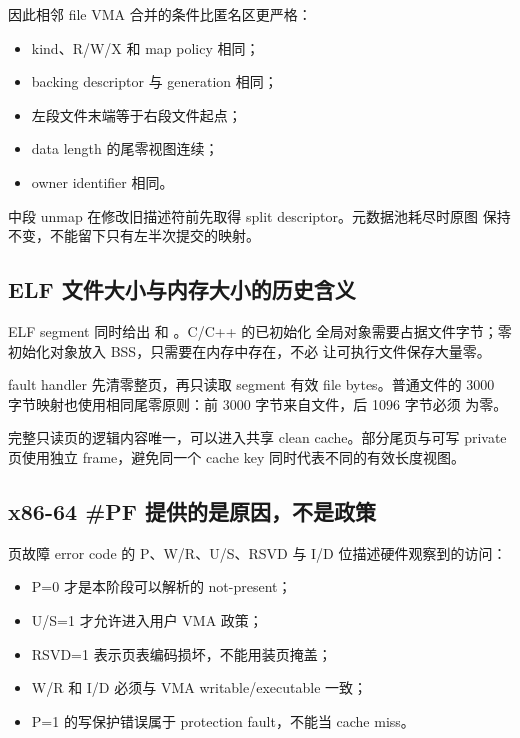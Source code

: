 因此相邻 file VMA 合并的条件比匿名区更严格：

\begin{itemize}
  \item kind、R/W/X 和 map policy 相同；
  \item backing descriptor 与 generation 相同；
  \item 左段文件末端等于右段文件起点；
  \item data length 的尾零视图连续；
  \item owner identifier 相同。
\end{itemize}

中段 unmap 在修改旧描述符前先取得 split descriptor。元数据池耗尽时原图
保持不变，不能留下只有左半次提交的映射。

\subsection{ELF 文件大小与内存大小的历史含义}

ELF segment 同时给出  和 。C/C++ 的已初始化
全局对象需要占据文件字节；零初始化对象放入 BSS，只需要在内存中存在，不必
让可执行文件保存大量零。

\begin{center}
\end{center}

fault handler 先清零整页，再只读取 segment 有效 file bytes。普通文件的
3000 字节映射也使用相同尾零原则：前 3000 字节来自文件，后 1096 字节必须
为零。

完整只读页的逻辑内容唯一，可以进入共享 clean cache。部分尾页与可写 private
页使用独立 frame，避免同一个 cache key 同时代表不同的有效长度视图。

\subsection{x86-64 \#PF 提供的是原因，不是政策}

页故障 error code 的 P、W/R、U/S、RSVD 与 I/D 位描述硬件观察到的访问：

\begin{itemize}
  \item P=0 才是本阶段可以解析的 not-present；
  \item U/S=1 才允许进入用户 VMA 政策；
  \item RSVD=1 表示页表编码损坏，不能用装页掩盖；
  \item W/R 和 I/D 必须与 VMA writable/executable 一致；
  \item P=1 的写保护错误属于 protection fault，不能当 cache miss。
\end{itemize}

